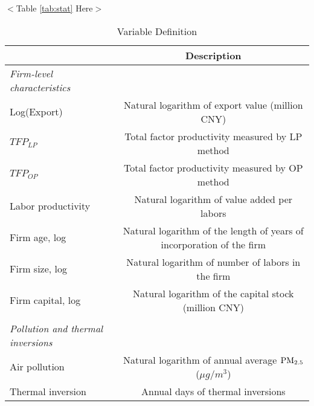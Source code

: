 \documentclass[12pt]{article}
\begin{document}
\begin{center}
$<$Table \ref{tab:stat} Here$>$
\end{center}

\newpage
\small



\newpage
\begin{table}[H]\centering
  \caption{Variable Definition}\label{tab:var_definition}
  \resizebox{\textwidth}{!}
  {
  \begin{tabular}{l*{1}{c}}
    \hline\hline
    &\multicolumn{1}{c}{Description}\\    
    \hline
    \textit{Firm-level characteristics} \\
    Log(Export)	& Natural logarithm of export value (million CNY) \\
    $TFP_{LP}$	&Total factor productivity measured by LP method \\
    $TFP_{OP}$	&Total factor productivity measured by OP method \\
    Labor productivity & Natural logarithm of value added per labors \\
    Firm age, log 	& Natural logarithm of the length of years of incorporation of the firm\\
    Firm size, log	& Natural logarithm of number of labors in the firm \\
    Firm capital, log	& Natural logarithm of the capital stock (million CNY) \\
                       &\\
    \textit{Pollution and thermal inversions} &\\    
    Air pollution     &Natural logarithm of annual average $\rm PM_{2.5}$ ($\mu g/m^3$) \\
    Thermal inversion	&Annual days of thermal inversions\\
    \hline\hline
  \end{tabular}
  }
\end{table}
\end{document}
